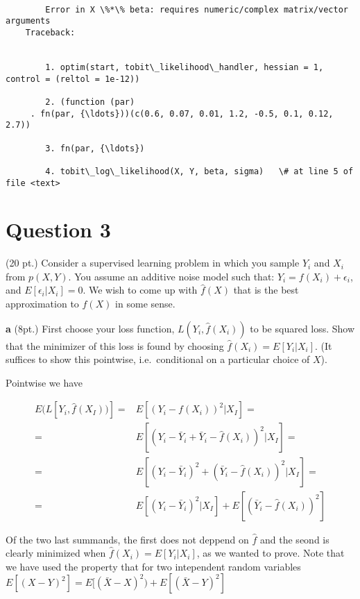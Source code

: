 \documentclass{article}
\begin{document}
    \begin{Verbatim}[commandchars=\\\{\}]

        Error in X \%*\% beta: requires numeric/complex matrix/vector arguments
    Traceback:


        1. optim(start, tobit\_likelihood\_handler, hessian = 1, control = (reltol = 1e-12))

        2. (function (par) 
     . fn(par, {\ldots}))(c(0.6, 0.07, 0.01, 1.2, -0.5, 0.1, 0.12, 2.7))

        3. fn(par, {\ldots})

        4. tobit\_log\_likelihood(X, Y, beta, sigma)   \# at line 5 of file <text>

    \end{Verbatim}

    \section{Question 3}\label{question-3}

(20 pt.) Consider a supervised learning problem in which you sample
\(Y_i\) and \(X_i\) from \(p(X,Y)\). You assume an additive noise model
such that: \(Y_i=f(X_i)+\epsilon_i\), and \(E[\epsilon_i|X_i]=0\). We
wish to come up with \(\hat{f}(X)\) that is the best approximation to
\(f(X)\) in some sense.

    \textbf{a} (8pt.) First choose your loss function,
\(L(Y_i,\hat f(X_i))\) to be squared loss. Show that the minimizer of
this loss is found by choosing \(\hat{f}(X_i)=E[Y_i|X_i]\). (It suffices
to show this pointwise, i.e.~conditional on a particular choice of
\(X\)).

    Pointwise we have

\begin{align*}
E(L[Y_i,\hat f(X_I))] = &
E[(Y_i-f(X_i))^2|X_I] =  \\ = &
E[(Y_i-\bar Y_i + \bar Y_i -\hat f(X_i))^2|X_I] =  \\ = &
E[(Y_i-\bar Y_i)^2+ ( \bar Y_i -\hat f(X_i))^2|X_I] =  \\ = &
E[(Y_i-\bar Y_i)^2|X_I] 
+ E[(\bar Y_i -\hat f(X_i))^2]
\end{align*}

Of the two last summands, the first does not deppend on \(\hat f\) and
the seond is clearly minimized when \(\hat{f}(X_i)=E[Y_i|X_i]\), as we
wanted to prove. Note that we have used the property that for two
intependent random variables
\(E[(X-Y)^2] = E[(\bar X -X)^2)+ E[(\bar X - Y)^2]\)
\end{document}
